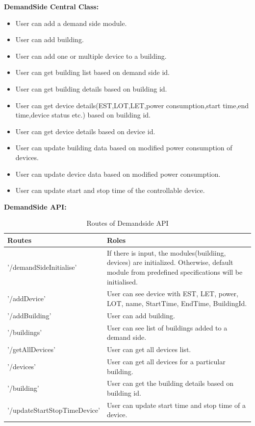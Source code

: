 \documentclass[runningheads]{llncs}
\begin{document}
{\raggedleft \textbf{DemandSide Central Class:}}
\begin{itemize}
    \item User can add a demand side module.
    \item User can add building.
    \item User can add  one or multiple device to a building.
    \item User can get building list  based on demand side id.
    \item User can get building details based on building id.
    \item User can  get device details(EST,LOT,LET,power consumption,start time,end time,device status etc.) based on building id.
    \item User can get device details based on device id.
    \item User can update building data based on modified  power consumption of devices.
    \item User can update device data based on modified  power consumption.
    \item User can update start and stop time of the  controllable device.
\end{itemize}
{\raggedleft \textbf{DemandSide API:}}\\
\begin{table}[H]
\centering
\caption{Routes of Demandside API}\label{tab1}
\begin{tabular}{|p{5 cm}|p{8.5 cm}|}
\hline
\textbf{Routes} & \textbf{Roles} \\
\hline
'/demandSideInitialise' & If there is input, the modules(buildiing, devices) are initialized. Otherwise, default module from predefined specifications will be initialised.\\
\hline
'/addDevice' & User can see device with EST, LET, power, LOT, name, StartTime, EndTime, BuildingId.\\
\hline
'/addBuilding' & User can add building.\\
\hline
'/buildings' & User can see list of buildings added to a demand side.\\
\hline
'/getAllDevices' & User can get all devices list.\\
\hline
'/devices' & User can get all devices  for a particular building.\\
\hline
'/building' & User can get the building details based on building id.\\
\hline
'/updateStartStopTimeDevice' & User can update start time  and stop time  of a device.\\
\hline
\end{tabular}
\end{table}
\end{document}
